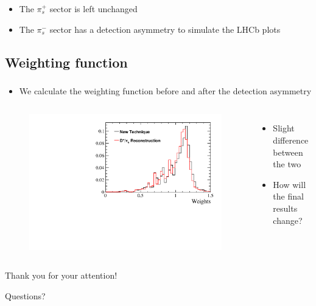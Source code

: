 \documentclass{beamer}
\begin{document}
\begin{frame}
\begin{columns}
      \end{columns}
      \begin{itemize}
            \item The $\pi_s^+$ sector is left unchanged
            \item The $\pi_s^-$ sector has a detection asymmetry to simulate the LHCb plots
      \end{itemize}
\end{frame}

\subsection{Weighting function}
\begin{frame}
      \frametitle{\insertsubsectionhead}
      \begin{itemize}
            \item We calculate the weighting function before and after the detection asymmetry
      \end{itemize}
      \begin{columns}
                  \begin{figure}
                        \centering
                        \includegraphics[width = \textwidth]{../work/RapidSimAnalysis/NewWeightingFunction/Plots/WeighsBeforeAfter.pdf}
                  \end{figure}
                  \begin{itemize}
                        \item Slight difference between the two
                        \item How will the final results change?
                  \end{itemize}
      \end{columns}
\end{frame}

\begin{frame}
      \LARGE
      \centering
      Thank you for your attention!

      Questions?
\end{frame}
\end{document}

